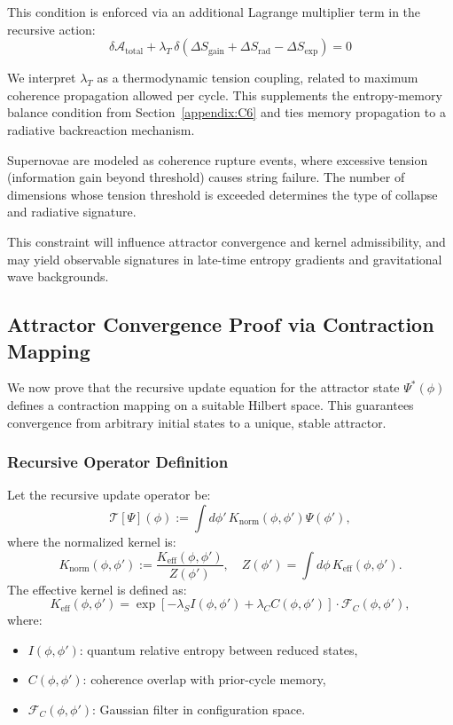 This condition is enforced via an additional Lagrange multiplier term in the recursive action:
\begin{equation}
\delta \mathcal{A}_{\text{total}} + \lambda_T \, \delta\left( \Delta S_{\text{gain}} + \Delta S_{\text{rad}} - \Delta S_{\text{exp}} \right) = 0
\end{equation}

We interpret \( \lambda_T \) as a thermodynamic tension coupling, related to maximum coherence propagation allowed per cycle. This supplements the entropy-memory balance condition from Section~\ref{appendix:C6} and ties memory propagation to a radiative backreaction mechanism.

Supernovae are modeled as coherence rupture events, where excessive tension (information gain beyond threshold) causes string failure. The number of dimensions whose tension threshold is exceeded determines the type of collapse and radiative signature.

This constraint will influence attractor convergence and kernel admissibility, and may yield observable signatures in late-time entropy gradients and gravitational wave backgrounds.
\subsection*{Attractor Convergence Proof via Contraction Mapping}
\label{appendix:C9}

We now prove that the recursive update equation for the attractor state \( \Psi^*(\phi) \) defines a contraction mapping on a suitable Hilbert space. This guarantees convergence from arbitrary initial states to a unique, stable attractor.

\subsubsection*{Recursive Operator Definition}

Let the recursive update operator be:
\begin{equation}
\mathcal{T}[\Psi](\phi) := \int d\phi' \, K_{\text{norm}}(\phi, \phi') \Psi(\phi'),
\end{equation}
where the normalized kernel is:
\begin{equation}
K_{\text{norm}}(\phi, \phi') := \frac{K_{\text{eff}}(\phi, \phi')}{Z(\phi')}, \quad Z(\phi') = \int d\phi \, K_{\text{eff}}(\phi, \phi').
\end{equation}
The effective kernel is defined as:
\begin{equation}
K_{\text{eff}}(\phi, \phi') = \exp\left[ -\lambda_S I(\phi, \phi') + \lambda_C C(\phi, \phi') \right] \cdot \mathcal{F}_C(\phi, \phi'),
\end{equation}
where:
\begin{itemize}
    \item \( I(\phi, \phi') \): quantum relative entropy between reduced states,
    \item \( C(\phi, \phi') \): coherence overlap with prior-cycle memory,
    \item \( \mathcal{F}_C(\phi, \phi') \): Gaussian filter in configuration space.
\end{itemize}

